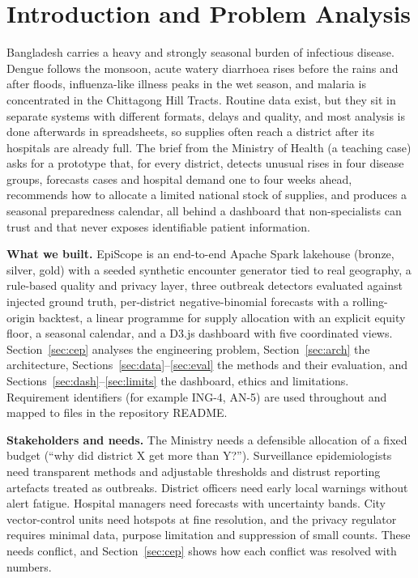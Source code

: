\section{Introduction and Problem Analysis}
Bangladesh carries a heavy and strongly seasonal burden of infectious disease. Dengue follows the monsoon, acute watery diarrhoea rises before the rains and after floods, influenza-like illness peaks in the wet season, and malaria is concentrated in the Chittagong Hill Tracts. Routine data exist, but they sit in separate systems with different formats, delays and quality, and most analysis is done afterwards in spreadsheets, so supplies often reach a district after its hospitals are already full. The brief from the Ministry of Health (a teaching case) asks for a prototype that, for every district, detects unusual rises in four disease groups, forecasts cases and hospital demand one to four weeks ahead, recommends how to allocate a limited national stock of supplies, and produces a seasonal preparedness calendar, all behind a dashboard that non-specialists can trust and that never exposes identifiable patient information.

\textbf{What we built.} EpiScope is an end-to-end Apache Spark lakehouse (bronze, silver, gold) with a seeded synthetic encounter generator tied to real geography, a rule-based quality and privacy layer, three outbreak detectors evaluated against injected ground truth, per-district negative-binomial forecasts with a rolling-origin backtest, a linear programme for supply allocation with an explicit equity floor, a seasonal calendar, and a D3.js dashboard with five coordinated views. Section~\ref{sec:cep} analyses the engineering problem, Section~\ref{sec:arch} the architecture, Sections~\ref{sec:data}--\ref{sec:eval} the methods and their evaluation, and Sections~\ref{sec:dash}--\ref{sec:limits} the dashboard, ethics and limitations. Requirement identifiers (for example ING-4, AN-5) are used throughout and mapped to files in the repository README.

\textbf{Stakeholders and needs.} The Ministry needs a defensible allocation of a fixed budget (``why did district X get more than Y?''). Surveillance epidemiologists need transparent methods and adjustable thresholds and distrust reporting artefacts treated as outbreaks. District officers need early local warnings without alert fatigue. Hospital managers need forecasts with uncertainty bands. City vector-control units need hotspots at fine resolution, and the privacy regulator requires minimal data, purpose limitation and suppression of small counts. These needs conflict, and Section~\ref{sec:cep} shows how each conflict was resolved with numbers.

